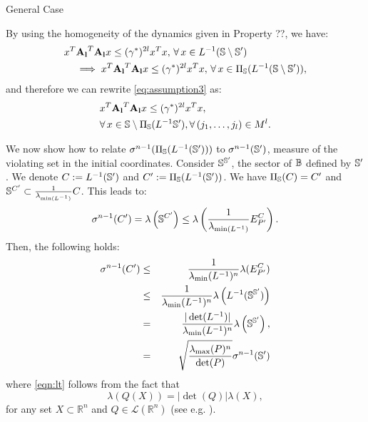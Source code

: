 \begin{subsection}{General Case}
\begin{pf}
{By using the homogeneity of the dynamics given in Property ??, we have:
\begin{equation*}
\begin{aligned}
&x^T \mathbf{\relax{A}_l}^T \mathbf{\relax{A}_l} x \leq ({\gamma^*})^{2l} x^T x,\, \forall\, x \in L^{-1}(\mathbb{S} \setminus \mathbb{S}') \\ &\quad \implies x^T \mathbf{\relax{A}_l}^T \mathbf{\relax{A}_l} x \leq ({\gamma^*})^{2l} x^T x,\, \forall\, x \in \Pi_{\mathbb{S}}(L^{-1}(\mathbb{S} \setminus \mathbb{S}')),
\end{aligned}
\end{equation*}
and therefore we can rewrite \eqref{eq:assumption3} as:
\begin{equation}\label{eq:assumption4}
\begin{aligned}
& x^T \mathbf{\relax{A}_l}^T \mathbf{\relax{A}_l} x \leq ({\gamma^*})^{2l} x^T x, \\
& \forall\, x \in \mathbb{S} \setminus  \Pi_{\mathbb{S}}(L^{-1}\mathbb{S}'), \forall\, (j_1,\dots,j_l) \in M^l.
\end{aligned}
\end{equation}
}

We now show how to relate $\sigma^{n-1}(\Pi_{\mathbb{S}}(L^{-1}(\mathbb{S}')))$ to $\sigma^{n-1}(\mathbb{S}')$, measure of the violating set in the initial coordinates. Consider $\mathbb{S}^{\mathbb{S}'}$, the sector of $\mathbb{B}$ defined by $\mathbb{S}'$. We denote $C:= L^{-1}(\mathbb{S}')$ and $C':=\Pi_{\mathbb{S}}(L^{-1}(\mathbb{S}'))$. We have $\Pi_{\mathbb{S}}(C) = C'$ and $\mathbb{S}^{C'} \subset \frac{1}{ \lambda_{\min (L^{-1})}} C$. This leads to:
$$\sigma^{n-1}(C') = \lambda \left( \mathbb{S}^{C'} \right) \leq \lambda \left( \frac{1}{ \lambda_{\min (L^{-1})}} E_{P'}^{C} \right).$$ Then, the following holds: \begin{eqnarray}
\nonumber\sigma^{n-1}(C') &\leq& \frac{1}{\lambda_{\min}(L^{-1})^n}\lambda(E_{P'}^{C}) \\
\nonumber &\leq&\frac{1}{\lambda_{\min}(L^{-1})^n} \lambda \left( L^{-1}(\mathbb{S}^{\mathbb{S}'}) \right)\\ 
\label{eqn:lt} &=&\frac{|\det(L^{-1})|}{\lambda_{\min}(L^{-1})^n}\lambda \left( \mathbb{S}^{\mathbb{S}'} \right),\\
\label{eqn:map1} &=&\sqrt{\frac{\lambda_{\max}(P)^n}{\det(P)}}\sigma^{n-1}(\mathbb{S}')
\end{eqnarray}
where \eqref{eqn:lt} follows from the fact that
$$ \lambda(Q(X)) = |\det(Q)| \lambda(X),$$
for any set $X \subset \mathbb{R}^n$ and $Q \in \mathcal{L}(\mathbb{R}^n)$ (see e.g. \cite{rudin}).


\end{pf}
\end{subsection}

